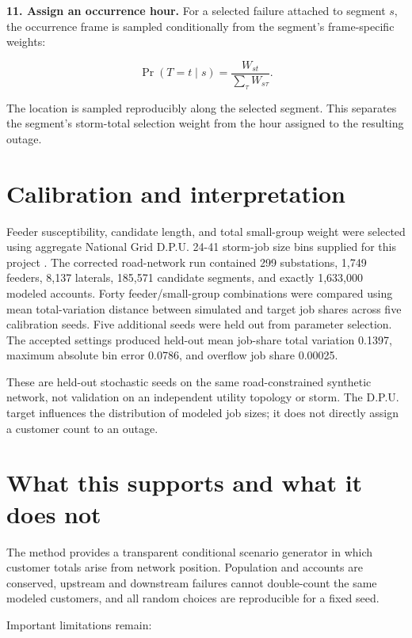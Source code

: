 \documentclass[11pt]{article}
\begin{document}
\textbf{11. Assign an occurrence hour.}
For a selected failure attached to segment $s$, the occurrence frame is sampled conditionally from the segment's frame-specific weights:

\begin{equation}
  \Pr(T=t\mid s)=\frac{W_{st}}{\sum_\tau W_{s\tau}}.
  \label{eq:frame}
\end{equation}

The location is sampled reproducibly along the selected segment. This separates the segment's storm-total selection weight from the hour assigned to the resulting outage.

\section*{Calibration and interpretation}

Feeder susceptibility, candidate length, and total small-group weight were selected using aggregate National Grid D.P.U. 24-41 storm-job size bins supplied for this project \citep{dpu2441}. The corrected road-network run contained 299 substations, 1,749 feeders, 8,137 laterals, 185,571 candidate segments, and exactly 1,633,000 modeled accounts. Forty feeder/small-group combinations were compared using mean total-variation distance between simulated and target job shares across five calibration seeds. Five additional seeds were held out from parameter selection. The accepted settings produced held-out mean job-share total variation 0.1397, maximum absolute bin error 0.0786, and overflow job share 0.00025.

These are held-out stochastic seeds on the same road-constrained synthetic network, not validation on an independent utility topology or storm. The D.P.U. target influences the distribution of modeled job sizes; it does not directly assign a customer count to an outage.

\section*{What this supports and what it does not}

The method provides a transparent conditional scenario generator in which customer totals arise from network position. Population and accounts are conserved, upstream and downstream failures cannot double-count the same modeled customers, and all random choices are reproducible for a fixed seed.

Important limitations remain:
\end{document}
